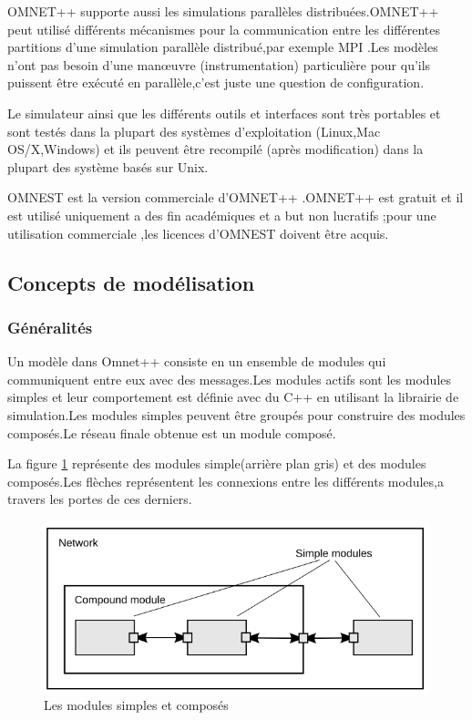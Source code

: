OMNET++ supporte aussi les simulations parallèles distribuées.OMNET++ peut utilisé différents mécanismes pour la communication entre les différentes partitions d'une simulation parallèle distribué,par exemple MPI .Les modèles n'ont pas besoin d'une manœuvre (instrumentation) particulière  pour qu'ils puissent être exécuté en parallèle,c'est juste une question de configuration.
 
Le simulateur ainsi que les différents outils et interfaces sont très portables et sont testés dans la plupart des systèmes  d'exploitation (Linux,Mac OS/X,Windows) et ils peuvent être recompilé (après modification) dans la plupart des système basés sur Unix.

OMNEST est la version commerciale d'OMNET++ .OMNET++ est gratuit et il est utilisé uniquement a des fin académiques et a but non lucratifs ;pour une utilisation commerciale ,les licences d'OMNEST doivent être acquis.

\subsection{Concepts de modélisation }
\subsubsection{Généralités}
Un modèle dans Omnet++ consiste en un ensemble de modules qui communiquent entre eux avec des messages.Les modules actifs sont les modules simples et leur comportement est définie avec du C++ en utilisant la librairie de simulation.Les modules simples peuvent être groupés pour construire des modules composés.Le réseau finale obtenue est  un module composé.

La figure \ref{simpleCompound} représente des modules simple(arrière plan gris) et des modules composés.Les flèches  représentent les connexions entre les différents modules,a travers les portes de ces derniers.

\begin{figure}[!h]
\includegraphics[scale=0.7]{simpleCompound}
\caption{\label{simpleCompound}Les modules simples et composés}
\end{figure}

